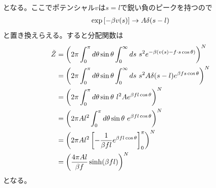 \documentclass[dvipdfmx, 11pt, a4paper]{jsarticle}
\theoremstyle{definition}
\begin{document}
    となる。ここでポテンシャル$v$は$s=l$で鋭い負のピークを持つので
    \begin{align}
        \exp \left[ -\beta v(s) \right] \rightarrow A\delta (s - l) \notag 
    \end{align}
    と置き換えらえる。すると分配関数は
    \begin{align}
        \tilde{Z} &= \left( 2\pi \int_0^{\pi} d\theta \sin \theta \int_0^{\infty} ds\ s^2e^{-\beta \left( v(s) - f \cdot s\cos \theta \right)} \right)^N \notag \\
        &= \left( 2\pi \int_0^{\pi} d\theta \sin \theta \int_0^{\infty} ds\ s^2 A\delta (s - l) e^{\beta f  s\cos \theta} \right)^N \notag \\
        &= \left( 2\pi \int_0^{\pi} d\theta \sin \theta\ l^2 A e^{\beta f  l\cos \theta} \right)^N \notag \\
        &= \left( 2\pi A l^2 \int_0^{\pi} d\theta \sin \theta\ e^{\beta f  l\cos \theta} \right)^N \notag \\
        &= \left( 2\pi A l^2 \left[  -\frac{1}{\beta f l}e^{\beta f  l\cos \theta} \right]_0^{\pi} \right)^N \notag \\
        &= \left(  \frac{4\pi A l}{\beta f} \sinh (\beta f l) \right)^N 
    \end{align}
    となる。
\end{document}
